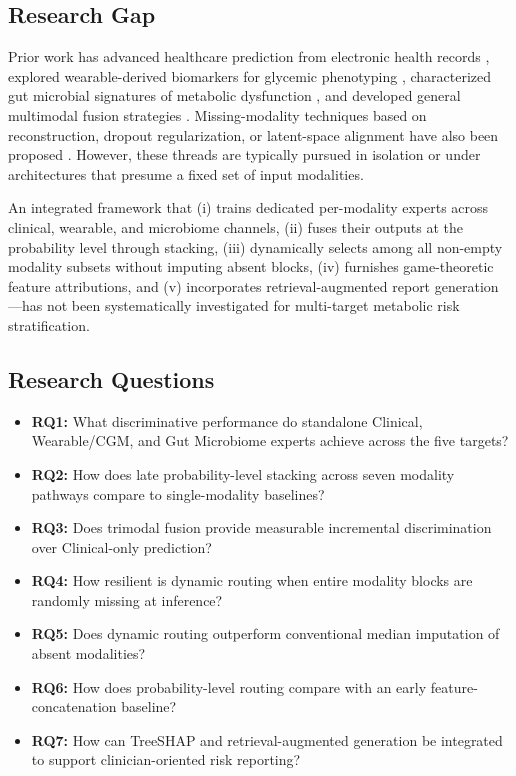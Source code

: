 \documentclass[10pt,twocolumn,letterpaper]{article}
\begin{document}
\subsection{Research Gap}
Prior work has advanced healthcare prediction from electronic health records \citep{rajkomar2018scalable, esteva2019guide}, explored wearable-derived biomarkers for glycemic phenotyping \citep{zeevi2015personalized, hall2018glucotypes, dunn2021wearable}, characterized gut microbial signatures of metabolic dysfunction \citep{qin2012metagenome, turnbaugh2006obesity, cani2019supplementation}, and developed general multimodal fusion strategies \citep{huang2020multimodal, kline2022multimodal}. Missing-modality techniques based on reconstruction, dropout regularization, or latent-space alignment have also been proposed \citep{ma2021smil, rubin1976inference, vanbuuren2011mice}. However, these threads are typically pursued in isolation or under architectures that presume a fixed set of input modalities.

An integrated framework that (i) trains dedicated per-modality experts across clinical, wearable, and microbiome channels, (ii) fuses their outputs at the probability level through stacking, (iii) dynamically selects among all non-empty modality subsets without imputing absent blocks, (iv) furnishes game-theoretic feature attributions, and (v) incorporates retrieval-augmented report generation---has not been systematically investigated for multi-target metabolic risk stratification.

\subsection{Research Questions}
\begin{itemize}
    \item \textbf{RQ1:} What discriminative performance do standalone Clinical, Wearable/CGM, and Gut Microbiome experts achieve across the five targets?
    \item \textbf{RQ2:} How does late probability-level stacking across seven modality pathways compare to single-modality baselines?
    \item \textbf{RQ3:} Does trimodal fusion provide measurable incremental discrimination over Clinical-only prediction?
    \item \textbf{RQ4:} How resilient is dynamic routing when entire modality blocks are randomly missing at inference?
    \item \textbf{RQ5:} Does dynamic routing outperform conventional median imputation of absent modalities?
    \item \textbf{RQ6:} How does probability-level routing compare with an early feature-concatenation baseline?
    \item \textbf{RQ7:} How can TreeSHAP and retrieval-augmented generation be integrated to support clinician-oriented risk reporting?
\end{itemize}
\end{document}
